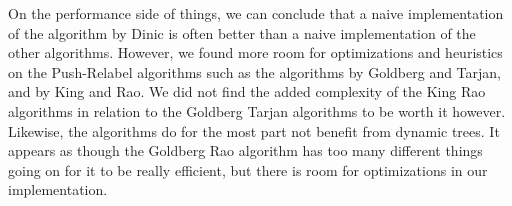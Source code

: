 On the performance side of things, we can conclude that a naive implementation of the algorithm by Dinic is often better than a naive implementation of the other algorithms.
However, we found more room for optimizations and heuristics on the Push-Relabel algorithms such as the algorithms by Goldberg and Tarjan, and by King and Rao.
We did not find the added complexity of the King Rao algorithms in relation to the Goldberg Tarjan algorithms to be worth it however.
Likewise, the algorithms do for the most part not benefit from dynamic trees.
It appears as though the Goldberg Rao algorithm has too many different things going on for it to be really efficient, but there is room for optimizations in our implementation.

























































